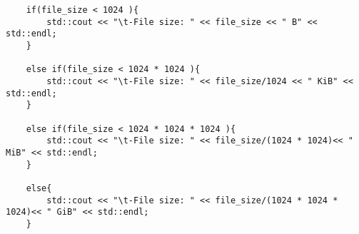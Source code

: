\begin{lstlisting}
    if(file_size < 1024 ){
        std::cout << "\t-File size: " << file_size << " B" << std::endl;
    }
    
    else if(file_size < 1024 * 1024 ){
        std::cout << "\t-File size: " << file_size/1024 << " KiB" << std::endl;
    }
    
    else if(file_size < 1024 * 1024 * 1024 ){
        std::cout << "\t-File size: " << file_size/(1024 * 1024)<< " MiB" << std::endl;
    }
    
    else{
        std::cout << "\t-File size: " << file_size/(1024 * 1024 * 1024)<< " GiB" << std::endl;
    }
\end{lstlisting}